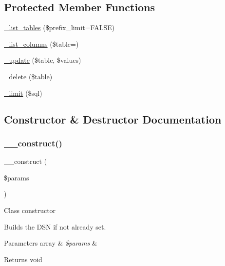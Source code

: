 \subsection*{Protected Member Functions}
\begin{DoxyCompactItemize}
\item 
\mbox{\hyperlink{class_c_i___d_b__pdo__ibm__driver_a435c0f3ce54fe7daa178baa8532ebd54}{\+\_\+list\+\_\+tables}} (\$prefix\+\_\+limit=F\+A\+L\+SE)
\item 
\mbox{\hyperlink{class_c_i___d_b__pdo__ibm__driver_a7ccb7f9c301fe7f0a9db701254142b63}{\+\_\+list\+\_\+columns}} (\$table=\textquotesingle{}\textquotesingle{})
\item 
\mbox{\hyperlink{class_c_i___d_b__pdo__ibm__driver_a2540b03a93fa73ae74c10d0e16fc073e}{\+\_\+update}} (\$table, \$values)
\item 
\mbox{\hyperlink{class_c_i___d_b__pdo__ibm__driver_a133ea8446ded52589bd22cc9163d0896}{\+\_\+delete}} (\$table)
\item 
\mbox{\hyperlink{class_c_i___d_b__pdo__ibm__driver_a3a02ea06541b8ecc25a33a61651562c8}{\+\_\+limit}} (\$sql)
\end{DoxyCompactItemize}


\subsection{Constructor \& Destructor Documentation}
\mbox{\label{class_c_i___d_b__pdo__ibm__driver_a9162320adff1a1a4afd7f2372f753a3e}} 
\subsubsection{\texorpdfstring{\+\_\+\+\_\+construct()}{\_\_construct()}}
{\footnotesize\ttfamily \+\_\+\+\_\+construct (\begin{DoxyParamCaption}\item[{}]{\$params }\end{DoxyParamCaption})}

Class constructor

Builds the D\+SN if not already set.


\begin{DoxyParams}[1]{Parameters}
array & {\em \$params} & \\
\hline
\end{DoxyParams}
\begin{DoxyReturn}{Returns}
void 
\end{DoxyReturn}


